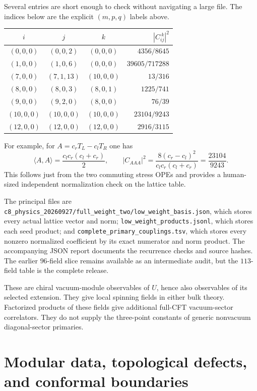 \documentclass[11pt,a4paper]{article}
\theoremstyle{definition}
\newcommand{\artifact}[1]{\textnormal{\nolinkurl{#1}}}
\begin{document}
Several entries are short enough to check without navigating a large
file. The indices below are the explicit $(m,p,q)$ labels above.
\begin{center}
\begin{tabular}{ccc|r}
\toprule
$i$&$j$&$k$&$|C_{ij}^{\ k}|^2$\\
\midrule
$(0,0,0)$&$(0,0,2)$&$(0,0,0)$&$4356/8645$\\
$(1,0,0)$&$(1,0,6)$&$(0,0,0)$&$39605/717288$\\
$(7,0,0)$&$(7,1,13)$&$(10,0,0)$&$13/316$\\
$(8,0,0)$&$(8,0,3)$&$(8,0,1)$&$1225/741$\\
$(9,0,0)$&$(9,2,0)$&$(8,0,0)$&$76/39$\\
$(10,0,0)$&$(10,0,0)$&$(10,0,0)$&$23104/9243$\\
$(12,0,0)$&$(12,0,0)$&$(12,0,0)$&$2916/3115$\\
\bottomrule
\end{tabular}
\end{center}
For example, for $A=c_rT_L-c_lT_R$ one has
\[
 \langle A,A\rangle=\frac{c_lc_r(c_l+c_r)}2,\qquad
 |C_{AAA}|^2=\frac{8(c_r-c_l)^2}{c_lc_r(c_l+c_r)}
 =\frac{23104}{9243}.
\]
This follows just from the two commuting stress OPEs and provides a
human-sized independent normalization check on the lattice table.

The principal files are
\artifact{c8_physics_20260927/full_weight_two/low_weight_basis.json},
which stores every actual lattice vector and norm;
\artifact{low_weight_products.jsonl}, which stores each seed product;
and \artifact{complete_primary_couplings.tsv}, which stores every
nonzero normalized coefficient by its exact numerator and norm product.
The accompanying JSON report documents the recurrence checks and
source hashes. The earlier $96$-field slice remains available as an
intermediate audit, but the $113$-field table is the complete release.

These are chiral vacuum-module observables of $U$, hence also
observables of its selected extension. They give local spinning fields
in either bulk theory. Factorized products of these fields give
additional full-CFT vacuum-sector correlators. They do not supply the
three-point constants of generic nonvacuum diagonal-sector primaries.

\section{Modular data, topological defects, and conformal boundaries}
\label{sec:physics-defects}
\end{document}
